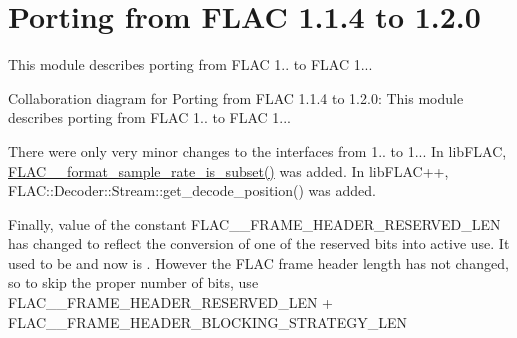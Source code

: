 \hypertarget{group__porting__1__1__4__to__1__2__0}{}\section{Porting from F\+L\+AC 1.1.4 to 1.2.0}
\label{group__porting__1__1__4__to__1__2__0}


This module describes porting from F\+L\+AC 1.. to F\+L\+AC 1...  


Collaboration diagram for Porting from F\+L\+AC 1.1.4 to 1.2.0\+:
This module describes porting from F\+L\+AC 1.. to F\+L\+AC 1... 

There were only very minor changes to the interfaces from 1.. to 1... In lib\+F\+L\+AC, {\ttfamily \hyperlink{group__flac__format_ga996f8732a2502ad79a68bb4a9f945235}{F\+L\+A\+C\+\_\+\+\_\+format\+\_\+sample\+\_\+rate\+\_\+is\+\_\+subset()}} was added. In lib\+F\+L\+A\+C++, {\ttfamily F\+L\+A\+C\+::\+Decoder\+::\+Stream\+::get\+\_\+decode\+\_\+position()} was added.

Finally, value of the constant {\ttfamily F\+L\+A\+C\+\_\+\+\_\+\+F\+R\+A\+M\+E\+\_\+\+H\+E\+A\+D\+E\+R\+\_\+\+R\+E\+S\+E\+R\+V\+E\+D\+\_\+\+L\+EN} has changed to reflect the conversion of one of the reserved bits into active use. It used to be {} and now is {}. However the F\+L\+AC frame header length has not changed, so to skip the proper number of bits, use {\ttfamily F\+L\+A\+C\+\_\+\+\_\+\+F\+R\+A\+M\+E\+\_\+\+H\+E\+A\+D\+E\+R\+\_\+\+R\+E\+S\+E\+R\+V\+E\+D\+\_\+\+L\+EN} + {\ttfamily F\+L\+A\+C\+\_\+\+\_\+\+F\+R\+A\+M\+E\+\_\+\+H\+E\+A\+D\+E\+R\+\_\+\+B\+L\+O\+C\+K\+I\+N\+G\+\_\+\+S\+T\+R\+A\+T\+E\+G\+Y\+\_\+\+L\+EN} 